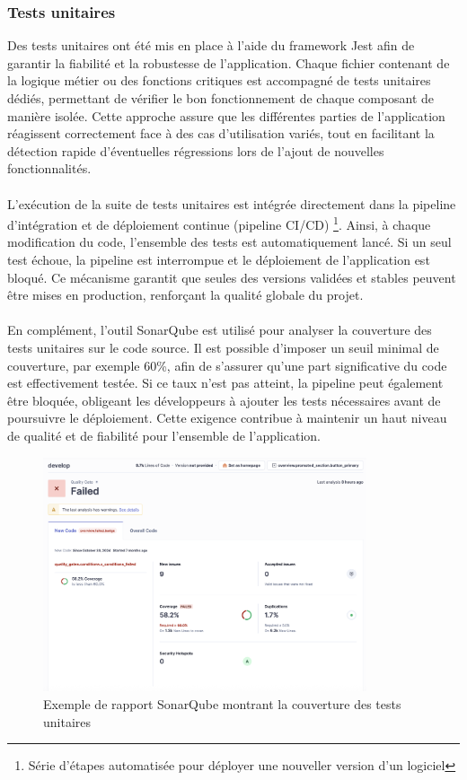 \documentclass[12pt]{article}
\begin{document}
\subsubsection{Tests unitaires}
Des tests unitaires ont été mis en place à l’aide du framework Jest afin de garantir la fiabilité et la robustesse de l’application. Chaque fichier contenant de la logique métier ou des fonctions critiques est accompagné de tests unitaires dédiés, permettant de vérifier le bon fonctionnement de chaque composant de manière isolée. Cette approche assure que les différentes parties de l’application réagissent correctement face à des cas d’utilisation variés, tout en facilitant la détection rapide d’éventuelles régressions lors de l’ajout de nouvelles fonctionnalités.
\\\\
L’exécution de la suite de tests unitaires est intégrée directement dans la pipeline d’intégration et de déploiement continue (pipeline CI/CD) \footnote{Série d'étapes automatisée pour déployer une nouveller version d'un logiciel}. Ainsi, à chaque modification du code, l’ensemble des tests est automatiquement lancé. Si un seul test échoue, la pipeline est interrompue et le déploiement de l’application est bloqué. Ce mécanisme garantit que seules des versions validées et stables peuvent être mises en production, renforçant la qualité globale du projet.
\\\\
En complément, l’outil SonarQube est utilisé pour analyser la couverture des tests unitaires sur le code source. Il est possible d’imposer un seuil minimal de couverture, par exemple 60\%, afin de s’assurer qu’une part significative du code est effectivement testée. Si ce taux n’est pas atteint, la pipeline peut également être bloquée, obligeant les développeurs à ajouter les tests nécessaires avant de poursuivre le déploiement. Cette exigence contribue à maintenir un haut niveau de qualité et de fiabilité pour l’ensemble de l’application.
\begin{figure}[H]
  \centering
  \includegraphics[width=0.85\textwidth]{img/sonarqube.png}
  \caption{Exemple de rapport SonarQube montrant la couverture des tests unitaires}
\end{figure}
\end{document}
